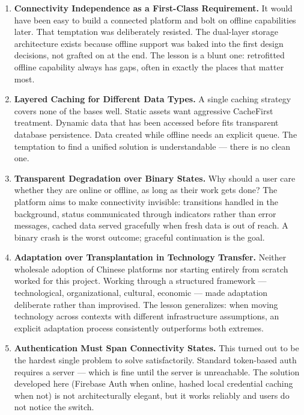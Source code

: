 \begin{enumerate}
\item \textbf{Connectivity Independence as a First-Class Requirement.} It would have been easy to build a connected platform and bolt on offline capabilities later. That temptation was deliberately resisted. The dual-layer storage architecture exists because offline support was baked into the first design decisions, not grafted on at the end. The lesson is a blunt one: retrofitted offline capability always has gaps, often in exactly the places that matter most.

\item \textbf{Layered Caching for Different Data Types.} A single caching strategy covers none of the bases well. Static assets want aggressive CacheFirst treatment. Dynamic data that has been accessed before fits transparent database persistence. Data created while offline needs an explicit queue. The temptation to find a unified solution is understandable --- there is no clean one.

\item \textbf{Transparent Degradation over Binary States.} Why should a user care whether they are online or offline, as long as their work gets done? The platform aims to make connectivity invisible: transitions handled in the background, status communicated through indicators rather than error messages, cached data served gracefully when fresh data is out of reach. A binary crash is the worst outcome; graceful continuation is the goal.

\item \textbf{Adaptation over Transplantation in Technology Transfer.} Neither wholesale adoption of Chinese platforms nor starting entirely from scratch worked for this project. Working through a structured framework --- technological, organizational, cultural, economic --- made adaptation deliberate rather than improvised. The lesson generalizes: when moving technology across contexts with different infrastructure assumptions, an explicit adaptation process consistently outperforms both extremes.

\item \textbf{Authentication Must Span Connectivity States.} This turned out to be the hardest single problem to solve satisfactorily. Standard token-based auth requires a server --- which is fine until the server is unreachable. The solution developed here (Firebase Auth when online, hashed local credential caching when not) is not architecturally elegant, but it works reliably and users do not notice the switch.


\end{enumerate}
